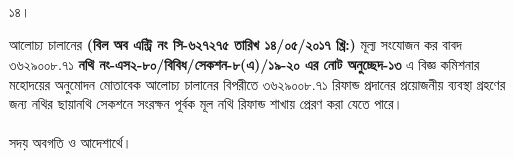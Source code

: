 \documentclass[12pt]{article}
\begin{document}
\\
\\
\\
\begin{minipage}[t]{0.05\linewidth}
১৪।
\end{minipage}
\begin{minipage}[t]{1\linewidth}
আলোচ্য চালানের
\textbf{(বিল অব এন্ট্রি নং সি-৬২৭২৭৫ তারিখ ১৪/০৫/২০১৭ খ্রি:)}
মূল্য সংযোজন কর বাবদ
৩৬২৯০০৮.৭১
\textbf{নথি নং-এস২-৮০/বিবিধ/সেকশন-৮(এ)/১৯-২০
এর নোট অনুচ্ছেদ-১৩} এ বিজ্ঞ কমিশনার মহোদয়ের
অনুমোদন মোতাবেক আলোচ্য চালানের
বিপরীতে
৩৬২৯০০৮.৭১
রিফান্ড প্রদানের প্রয়োজনীয় ব্যবস্থা গ্রহণের জন্য
নথির ছায়ানথি সেকশনে সংরক্ষন পূর্বক
মূল নথি রিফান্ড শাখায় প্রেরণ করা যেতে পারে।
\\
\\
সদয় অবগতি ও আদেশার্থে।
\end{minipage}

\thispagestyle{laststyle}
\end{document}
